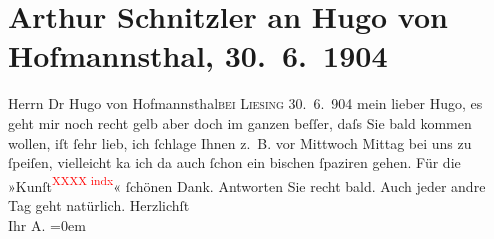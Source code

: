 

         \renewcommand{\erwaehnteWerke}{}
               \section[Arthur Schnitzler an Hugo von Hofmannsthal, 30. 6. 1904]{ Arthur Schnitzler an Hugo von Hofmannsthal, 30. 6. 1904}\nopagebreak{}\rehead{ }\begin{ledgroupsized}[t]{13cm}\normalsize\beginnumbering \toendnotes[C]{\smallbreak\pagebreak[2]} 
\toendnotes[C]{\smallbreak}\pstart{}{\pb}Herrn Dr Hugo von Hofmannsthal\pend{}\pstart{}\textsc{\label{K_L01412_1v}\label{K_L01412_1h}}\pend{}\pstart{}\textsc{bei Liesing}\pend{}{\bigskip}\pstart
           \raggedleft{}{\pb}30. 6. 904\pend
           \pstart
           mein lieber Hugo, es geht mir noch recht gelb aber doch im ganzen
               beſſer, daſs Sie bald kommen wollen, iſt ſehr lieb, ich ſchlage Ihnen z. B. vor
                  Mittwoch{ }Mittag bei uns zu ſpeiſen, vielleicht ka{\geminationn}
               ich da auch ſchon ein bischen ſpaziren gehen. Für die »Kunſt\textcolor{red}{\textsuperscript{XXXX indx}}« ſchönen Dank. Antworten Sie recht bald. Auch jeder andre Tag geht
               natürlich.\pend
           \pstart
           Herzlichſt{\\[\baselineskip]}Ihr \spacefill\mbox{A.}\pend
           \leftskip=0em{}
         
         \endnumbering{}\end{ledgroupsized}  \newcommand{\dateiname}{L01412}\newcommand{\titel}{Arthur Schnitzler an Hugo von Hofmannsthal, 30. 6. 1904}\newcommand{\editorInnen}{Martin Anton Müller und Gerd-Hermann Susen}
      